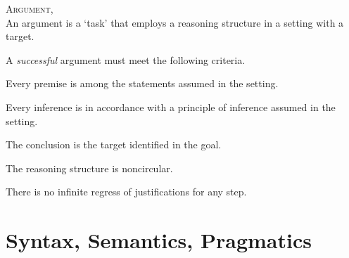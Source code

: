 \documentclass{article}
\begin{document}
\begin{definition} \textsc{Argument}, \cite[5]{parsons96argument}\\
An argument is a `task' that employs a reasoning structure in a setting with a target.
\end{definition}

A \textsl{successful} argument must meet the following criteria.

\begin{criterion}
Every premise is among the statements assumed in the setting.
\end{criterion}

\begin{criterion}
Every inference is in accordance with a principle of inference assumed in the setting.
\end{criterion}

\begin{criterion}
The conclusion is the target identified in the goal.
\end{criterion}

\begin{criterion}
The reasoning structure is noncircular.
\end{criterion}

\begin{criterion}
There is no infinite regress of justifications for any step.
\end{criterion}



\part{Syntax, Semantics, Pragmatics}


\end{document}
